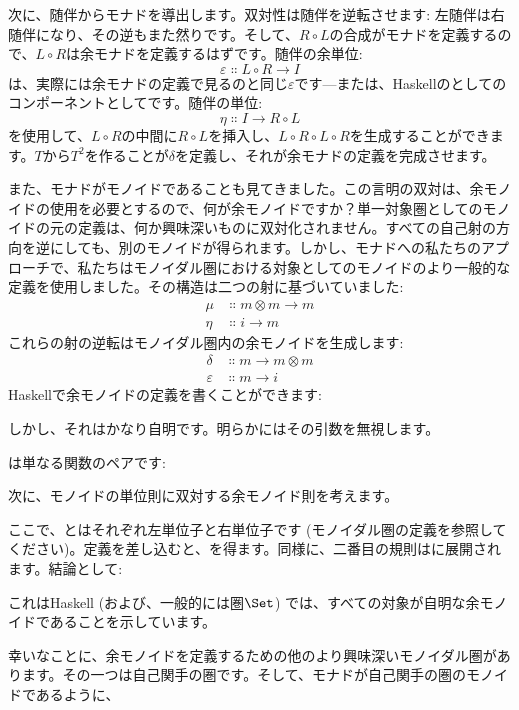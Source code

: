 次に、随伴からモナドを導出します。双対性は随伴を逆転させます: 左随伴は右随伴になり、その逆もまた然りです。そして、$R \circ L$の合成がモナドを定義するので、$L \circ R$は余モナドを定義するはずです。随伴の余単位: 
\[\varepsilon \Colon L \circ R \to I\]
は、実際には余モナドの定義で見るのと同じ$\varepsilon$です---または、Haskellのとしてのコンポーネントとしてです。随伴の単位: 
\[\eta \Colon I \to R \circ L\]
を使用して、$L \circ R$の中間に$R \circ L$を挿入し、$L \circ R \circ L \circ R$を生成することができます。$T$から$T^2$を作ることが$\delta$を定義し、それが余モナドの定義を完成させます。

また、モナドがモノイドであることも見てきました。この言明の双対は、余モノイドの使用を必要とするので、何が余モノイドですか？単一対象圏としてのモノイドの元の定義は、何か興味深いものに双対化されません。すべての自己射の方向を逆にしても、別のモノイドが得られます。しかし、モナドへの私たちのアプローチで、私たちはモノイダル圏における対象としてのモノイドのより一般的な定義を使用しました。その構造は二つの射に基づいていました: 
\begin{align*}
  \mu  & \Colon m \otimes m \to m \\
  \eta & \Colon i \to m
\end{align*}
これらの射の逆転はモノイダル圏内の余モノイドを生成します: 
\begin{align*}
  \delta      & \Colon m \to m \otimes m \\
  \varepsilon & \Colon m \to i
\end{align*}
Haskellで余モノイドの定義を書くことができます: 

しかし、それはかなり自明です。明らかにはその引数を無視します。

は単なる関数のペアです: 

次に、モノイドの単位則に双対する余モノイド則を考えます。

ここで、とはそれぞれ左単位子と右単位子です (モノイダル圏の定義を参照してください)。定義を差し込むと、を得ます。同様に、二番目の規則はに展開されます。結論として: 

これはHaskell (および、一般的には圏$\Set$) では、すべての対象が自明な余モノイドであることを示しています。

幸いなことに、余モノイドを定義するための他のより興味深いモノイダル圏があります。その一つは自己関手の圏です。そして、モナドが自己関手の圏のモノイドであるように、

